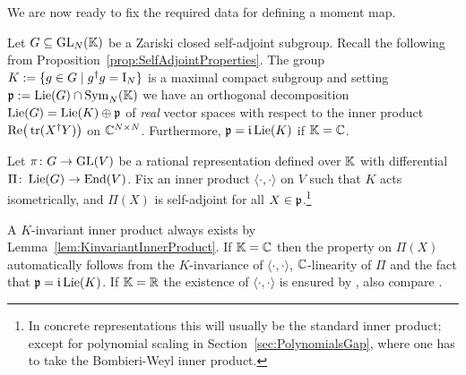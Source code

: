 We are now ready to fix the required data for defining a moment map.

\begin{setting}\label{set:MomentMap}
	Let $G \subseteq \operatorname{GL}_N(\mathbb K)$ be a Zariski closed self-adjoint subgroup.
	Recall the following from Proposition~\ref{prop:SelfAdjointProperties}. The group $K := \{ g \in G \mid g^{\dagger} g = \operatorname{I}_N \}$ is a maximal compact subgroup and setting $\mathfrak{p} := \operatorname{Lie}(G) \cap \operatorname{Sym}_N(\mathbb K)$ we have an orthogonal decomposition $\operatorname{Lie}(G) = \operatorname{Lie}(K) \oplus \mathfrak{p}$ of \emph{real} vector spaces with respect to the inner product $\mathrm{Re} \big( \operatorname{tr}(X^{\dagger} Y) \big)$ on $\mathbb C^{N \times N}$. Furthermore, $\mathfrak{p} = \mathfrak{i} \operatorname{Lie}(K)$ if $\mathbb K = \mathbb C$.
	
	Let $\pi \colon G \to \operatorname{GL}(V)$ be a rational representation defined over $\mathbb K$ with differential $\Pi \colon \operatorname{Lie}(G) \to \operatorname{End}(V)$. Fix an inner product $\langle \cdot, \cdot \rangle$ on $V$ such that $K$ acts isometrically, and $\Pi(X)$ is self-adjoint
	for all $X \in \mathfrak{p}$.\footnote{In concrete representations this will usually be the standard inner product; except for polynomial scaling in Section~\ref{sec:PolynomialsGap}, where one has to take the Bombieri-Weyl inner product.}
	
	A $K$-invariant inner product always exists by Lemma~\ref{lem:KinvariantInnerProduct}. If $\mathbb K = \mathbb C$ then the property on $\Pi(X)$ automatically follows from the $K$-invariance of $\langle \cdot , \cdot \rangle$, $\mathbb C$-linearity of $\Pi$ and the fact that $\mathfrak{p} = \mathfrak{i} \operatorname{Lie}(K)$. If $\mathbb K = \mathbb R$ the existence of $\langle \cdot, \cdot \rangle$ is ensured by \cite[Proposition~13.5]{BorelHarishChandra}, also compare \cite[§2.3]{RichardsonSlodowy}.
	\hfill{}
\end{setting}


